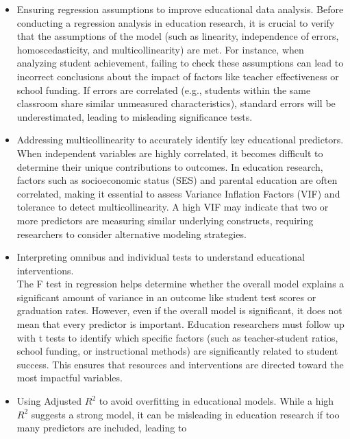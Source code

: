 \documentclass[
  letterpaper,
  DIV=11,
  numbers=noendperiod]{scrreprt}
\begin{document}

\begin{itemize}
\item
  Ensuring regression assumptions to improve educational data analysis.
  Before conducting a regression analysis in education research, it is
  crucial to verify that the assumptions of the model (such as
  linearity, independence of errors, homoscedasticity, and
  multicollinearity) are met. For instance, when analyzing student
  achievement, failing to check these assumptions can lead to incorrect
  conclusions about the impact of factors like teacher effectiveness or
  school funding. If errors are correlated (e.g., students within the
  same classroom share similar unmeasured characteristics), standard
  errors will be underestimated, leading to misleading significance
  tests.
\item
  Addressing multicollinearity to accurately identify key educational
  predictors.\\
  When independent variables are highly correlated, it becomes difficult
  to determine their unique contributions to outcomes. In education
  research, factors such as socioeconomic status (SES) and parental
  education are often correlated, making it essential to assess Variance
  Inflation Factors (VIF) and tolerance to detect multicollinearity. A
  high VIF may indicate that two or more predictors are measuring
  similar underlying constructs, requiring researchers to consider
  alternative modeling strategies.
\item
  Interpreting omnibus and individual tests to understand educational
  interventions.\\
  The F test in regression helps determine whether the overall model
  explains a significant amount of variance in an outcome like student
  test scores or graduation rates. However, even if the overall model is
  significant, it does not mean that every predictor is important.
  Education researchers must follow up with t tests to identify which
  specific factors (such as teacher-student ratios, school funding, or
  instructional methods) are significantly related to student success.
  This ensures that resources and interventions are directed toward the
  most impactful variables.
\item
  Using Adjusted \(R^2\) to avoid overfitting in educational models.
  While a high \(R^2\) suggests a strong model, it can be misleading in
  education research if too many predictors are included, leading to

\end{itemize}
\end{document}
